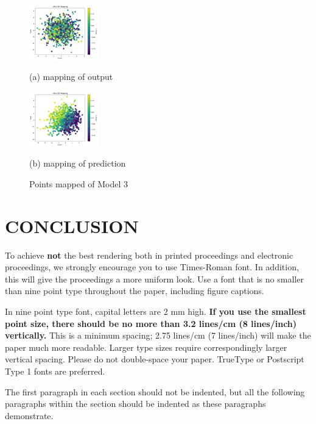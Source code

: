 \documentclass{article}
\begin{document}
\begin{figure}[htb]
  \begin{minipage}[a]{.48\linewidth}
    \centering
    \centerline{\includegraphics[width=3.0cm]{images/q5_1}}
    \centerline{(a) mapping of output}\medskip
  \end{minipage}
  \hfill
  \begin{minipage}[c]{0.48\linewidth}
    \centering
    \centerline{\includegraphics[width=3.0cm]{images/q5_2}}
    \centerline{(b) mapping of prediction}\medskip
  \end{minipage}
  \caption{Points mapped of Model 3}
  \label{fig:q5}
  \end{figure}

\section{CONCLUSION}
\label{sec:conclusion}

To achieve {\bf not} the best rendering both in printed proceedings and electronic proceedings, we
strongly encourage you to use Times-Roman font.  In addition, this will give
the proceedings a more uniform look.  Use a font that is no smaller than nine
point type throughout the paper, including figure captions.

In nine point type font, capital letters are 2 mm high.  {\bf If you use the
smallest point size, there should be no more than 3.2 lines/cm (8 lines/inch)
vertically.}  This is a minimum spacing; 2.75 lines/cm (7 lines/inch) will make
the paper much more readable.  Larger type sizes require correspondingly larger
vertical spacing.  Please do not double-space your paper.  TrueType or
Postscript Type 1 fonts are preferred.

The first paragraph in each section should not be indented, but all the
following paragraphs within the section should be indented as these paragraphs
demonstrate.
\end{document}
